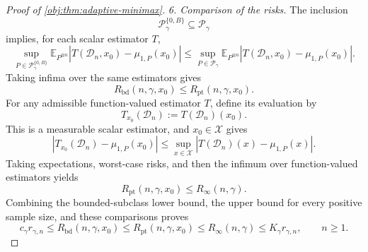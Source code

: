 \begin{proof}[Proof of \cref{obj:thm:adaptive-minimax}]
\emph{6. Comparison of the risks.}
The inclusion
\[
\mathcal P_\gamma^{\{0,B\}}\subseteq\mathcal P_\gamma
\]
implies, for each scalar estimator \(T\),
\[
\sup_{P\in\mathcal P_\gamma^{\{0,B\}}}
\mathbb E_{P^{\otimes n}}
|T(\mathcal D_n,x_0)-\mu_{1,P}(x_0)|
\le
\sup_{P\in\mathcal P_\gamma}
\mathbb E_{P^{\otimes n}}
|T(\mathcal D_n,x_0)-\mu_{1,P}(x_0)|.
\]
Taking infima over the same estimators gives
\[
R_{\mathrm{bd}}(n,\gamma,x_0)
\le R_{\mathrm{pt}}(n,\gamma,x_0).
\]
For any admissible function-valued estimator \(T\), define its evaluation by
\[
T_{x_0}(\mathcal D_n):=T(\mathcal D_n)(x_0).
\]
This is a measurable scalar estimator, and \(x_0\in\mathcal X\) gives
\[
|T_{x_0}(\mathcal D_n)-\mu_{1,P}(x_0)|
\le
\sup_{x\in\mathcal X}
|T(\mathcal D_n)(x)-\mu_{1,P}(x)|.
\]
Taking expectations, worst-case risks, and then the infimum over function-valued estimators yields
\[
R_{\mathrm{pt}}(n,\gamma,x_0)\le R_\infty(n,\gamma).
\]
Combining the bounded-subclass lower bound, the upper bound for every positive sample size, and these comparisons proves
\[
c_\gamma r_{\gamma,n}
\le R_{\mathrm{bd}}(n,\gamma,x_0)
\le R_{\mathrm{pt}}(n,\gamma,x_0)
\le R_\infty(n,\gamma)
\le K_\gamma r_{\gamma,n},
\qquad n\ge1.
\]
\end{proof}

